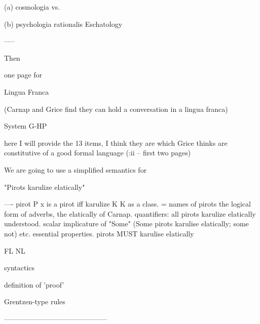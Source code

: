 \documentclass[10pt,titlepage]{book}
\begin{document}
                                                                            
   (a) cosmologia
                                             vs.
 
                                                                            
   (b) psychologia rationalis
                                     Eschatology
 
                    
         
 
-----
 
Then
 
                             one page for
 
 
 
                               Lingua Franca
 
               (Carnap and Grice find they can hold
               a conversation in a lingua franca)
 
                         System G-HP
 
                    here I will provide 
                   the 13 items, I think they are
                 which Grice thinks are constitutive
                    of a good formal language
                    (\cite{grice89}:ii -- first two pages)
 
 
 
 We are going to use a simplified semantics for
 
         "Pirots karulize  elatically"
 
---- pirot P  x is a pirot iff
    karulize K   K as  a class. = 
    names of pirots
    the logical form of adverbs, the elatically of  Carnap.
    quantifiers: all pirots karulize elatically  understood.
          scalar implicature  of "Some" (Some pirots karulise elatically; 
some not)
    etc.
    essential properties.
        pirots MUST karulise  elatically
 
 
 
          FL                                          NL
 
 
                  syntactics
 
                 
 
                definition of 'proof'
 
                
              
                 Grentzen-type rules
 
 
           --------------------------------------------
 
\end{document}
